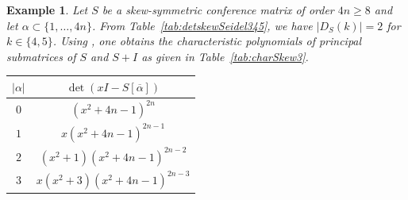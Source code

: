 \documentclass[11pt]{article}
\newtheorem{example}[theorem]{Example}
\begin{document}
\begin{example}
\label{ex:skew3}
Let $S$ be a skew-symmetric conference matrix of order $4n \geqslant 8$ and let $\alpha \subset \{1,\dots,4n\}$. 
From Table~\ref{tab:detskewSeidel345}, we have $|D_S(k)|=2$ for $k \in \{4,5\}$.
Using \cite[Section 4]{GS}, one obtains the characteristic polynomials of principal submatrices of $S$ and $S+I$ as given in Table~\ref{tab:charSkew3}.
\begin{table}[H]
    \centering
    \begin{tabular}{c|c}
        $|\alpha|$ & $\det(xI-S[\overline \alpha])$   \\
        \hline
        $0$ & $(x^2+4n-1)^{2n}$  \\
        $1$ & $x(x^2+4n-1)^{2n-1}$ \\
        $2$ & $(x^2+1)(x^2+4n-1)^{2n-2}$ \\
        $3$ & $x(x^2+3)(x^2+4n-1)^{2n-3}$  \\

\end{tabular}
\end{table}
\end{example}
\end{document}
